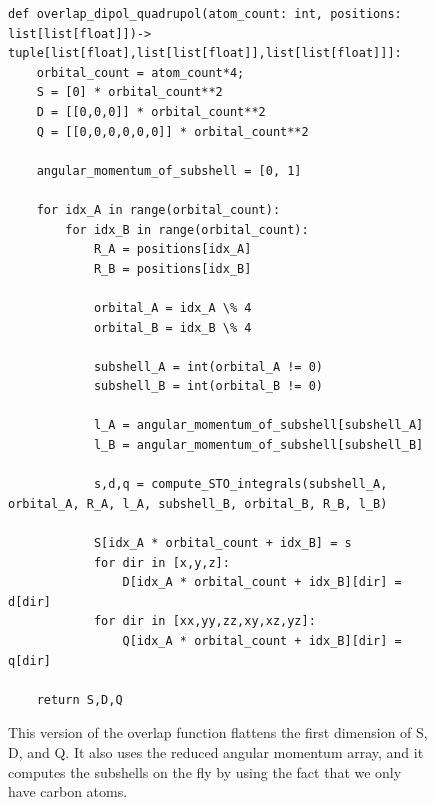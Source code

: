 \begin{figure}[H]
\begin{verbatim}
def overlap_dipol_quadrupol(atom_count: int, positions: list[list[float]])-> tuple[list[float],list[list[float]],list[list[float]]]:
    orbital_count = atom_count*4;
    S = [0] * orbital_count**2
    D = [[0,0,0]] * orbital_count**2
    Q = [[0,0,0,0,0,0]] * orbital_count**2

    angular_momentum_of_subshell = [0, 1]

    for idx_A in range(orbital_count):
        for idx_B in range(orbital_count):
            R_A = positions[idx_A]
            R_B = positions[idx_B]

            orbital_A = idx_A \% 4
            orbital_B = idx_B \% 4

            subshell_A = int(orbital_A != 0)
            subshell_B = int(orbital_B != 0)

            l_A = angular_momentum_of_subshell[subshell_A]
            l_B = angular_momentum_of_subshell[subshell_B]

            s,d,q = compute_STO_integrals(subshell_A, orbital_A, R_A, l_A, subshell_B, orbital_B, R_B, l_B)

            S[idx_A * orbital_count + idx_B] = s
            for dir in [x,y,z]:
                D[idx_A * orbital_count + idx_B][dir] = d[dir]
            for dir in [xx,yy,zz,xy,xz,yz]:
                Q[idx_A * orbital_count + idx_B][dir] = q[dir]

    return S,D,Q
\end{verbatim}
\caption{This version of the overlap function flattens the first dimension of S, D, and Q. It also uses the reduced angular momentum array, and it computes the subshells on the fly by using the fact that we only have carbon atoms.}
\end{figure}



